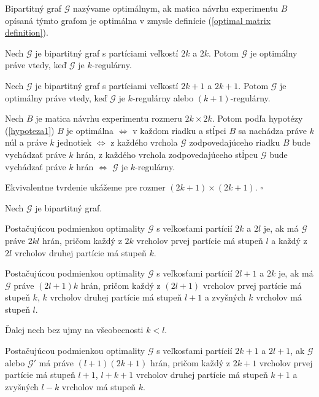 \begin{defin}
Bipartitný graf $\mathcal{G}$ nazývame optimálnym, ak matica návrhu experimentu $B$ opísaná týmto grafom je optimálna v zmysle definície (\ref{optimal matrix definition}).
\end{defin}

\begin{hypoteza}
Nech $\mathcal{G}$ je bipartitný graf s partíciami veľkostí $2k$ a $2k$.
Potom $\mathcal{G}$ je optimálny práve vtedy, keď $\mathcal{G}$ je $k$-regulárny.

Nech $\mathcal{G}$ je bipartitný graf s partíciami veľkostí $2k + 1$ a $2k + 1$.
Potom $\mathcal{G}$ je optimálny práve vtedy, keď $\mathcal{G}$ je $k$-regulárny alebo $(k + 1)$-regulárny.
\end{hypoteza}

\begin{dokaz}
Nech $B$ je matica návrhu experimentu rozmeru $2k \times 2k$. Potom podľa hypotézy (\ref{hypoteza1})
$B$ je optimálna $\Leftrightarrow$ v každom riadku a stĺpci $B$ sa nachádza práve $k$ núl a práve $k$ jednotiek $\Leftrightarrow$
z každého vrchola $\mathcal{G}$ zodpovedajúceho riadku $B$ bude vychádzať práve $k$ hrán,
z každého vrchola zodpovedajúceho stĺpcu $\mathcal{G}$ bude vychádzať práve $k$ hrán $\Leftrightarrow$ $\mathcal{G}$ je $k$-regulárny.

Ekvivalentne tvrdenie ukážeme pre rozmer $(2k + 1) \times (2k + 1)$. $\square$
\end{dokaz}

\begin{hypoteza}
Nech $\mathcal{G}$ je bipartitný graf.

Postačujúcou podmienkou optimality $\mathcal{G}$ s veľkosťami partícií $2k$ a $2l$ je, ak má $\mathcal{G}$ práve $2kl$ hrán,
pričom každý z $2k$ vrcholov prvej partície má stupeň $l$ a každý z $2l$ vrcholov druhej partície má stupeň $k$.

Postačujúcou podmienkou optimality $\mathcal{G}$ s veľkosťami partícií $2l + 1$ a $2k$ je, ak má $\mathcal{G}$ práve $(2l + 1)k$ hrán,
pričom každý z $(2l + 1)$ vrcholov prvej partície má stupeň $k$, $k$ vrcholov druhej partície má stupeň $l + 1$ a zvyšných $k$ vrcholov má stupeň $l$.

Ďalej nech bez ujmy na všeobecnosti $k < l$.

Postačujúcou podmienkou optimality $\mathcal{G}$ s veľkosťami partícií $2k + 1$ a $2l + 1$, ak $\mathcal{G}$ alebo $\mathcal{G}'$ má práve $(l + 1)(2k + 1)$ hrán,
pričom každý z $2k + 1$ vrcholov prvej partície má stupeň $l + 1$, $l + k + 1$ vrcholov druhej partície má stupeň $k + 1$ a zvyšných $l - k$ vrcholov má stupeň $k$.
\end{hypoteza}

